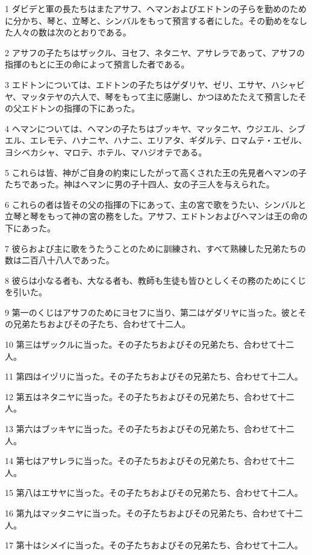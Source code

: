 \par 1 ダビデと軍の長たちはまたアサフ、ヘマンおよびエドトンの子らを勤めのために分かち、琴と、立琴と、シンバルをもって預言する者にした。その勤めをなした人々の数は次のとおりである。
\par 2 アサフの子たちはザックル、ヨセフ、ネタニヤ、アサレラであって、アサフの指揮のもとに王の命によって預言した者である。
\par 3 エドトンについては、エドトンの子たちはゲダリヤ、ゼリ、エサヤ、ハシャビヤ、マッタテヤの六人で、琴をもって主に感謝し、かつほめたたえて預言したその父エドトンの指揮の下にあった。
\par 4 ヘマンについては、ヘマンの子たちはブッキヤ、マッタニヤ、ウジエル、シブエル、エレモテ、ハナニヤ、ハナニ、エリアタ、ギダルテ、ロマムテ・エゼル、ヨシベカシャ、マロテ、ホテル、マハジオテである。
\par 5 これらは皆、神がご自身の約束にしたがって高くされた王の先見者ヘマンの子たちであった。神はヘマンに男の子十四人、女の子三人を与えられた。
\par 6 これらの者は皆その父の指揮の下にあって、主の宮で歌をうたい、シンバルと立琴と琴をもって神の宮の務をした。アサフ、エドトンおよびヘマンは王の命の下にあった。
\par 7 彼らおよび主に歌をうたうことのために訓練され、すべて熟練した兄弟たちの数は二百八十八人であった。
\par 8 彼らは小なる者も、大なる者も、教師も生徒も皆ひとしくその務のためにくじを引いた。
\par 9 第一のくじはアサフのためにヨセフに当り、第二はゲダリヤに当った。彼とその兄弟たちおよびその子たち、合わせて十二人。
\par 10 第三はザックルに当った。その子たちおよびその兄弟たち、合わせて十二人。
\par 11 第四はイヅリに当った。その子たちおよびその兄弟たち、合わせて十二人。
\par 12 第五はネタニヤに当った。その子たちおよびその兄弟たち、合わせて十二人。
\par 13 第六はブッキヤに当った。その子たちおよびその兄弟たち、合わせて十二人。
\par 14 第七はアサレラに当った。その子たちおよびその兄弟たち、合わせて十二人。
\par 15 第八はエサヤに当った。その子たちおよびその兄弟たち、合わせて十二人。
\par 16 第九はマッタニヤに当った。その子たちおよびその兄弟たち、合わせて十二人。
\par 17 第十はシメイに当った。その子たちおよびその兄弟たち、合わせて十二人。
